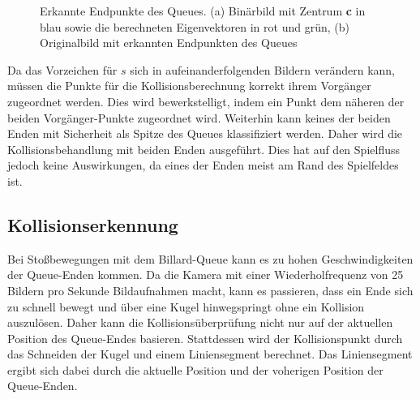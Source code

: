 \begin{figure}[H]
	\label{fig:pca}
	\centering
	\caption{Erkannte Endpunkte des Queues. (a) Binärbild mit Zentrum \textbf{c} in blau sowie die berechneten Eigenvektoren in rot und grün, (b) Originalbild mit erkannten Endpunkten des Queues}
\end{figure}


Da das Vorzeichen für $s$ sich in aufeinanderfolgenden Bildern verändern kann, müssen die Punkte für die Kollisionsberechnung korrekt ihrem Vorgänger zugeordnet werden.
Dies wird bewerkstelligt, indem ein Punkt dem näheren der beiden Vorgänger-Punkte zugeordnet wird.
Weiterhin kann keines der beiden Enden mit Sicherheit als Spitze des Queues klassifiziert werden.
Daher wird die Kollisionsbehandlung mit beiden Enden ausgeführt.
Dies hat auf den Spielfluss jedoch keine Auswirkungen, da eines der Enden meist am Rand des Spielfeldes ist.

\subsection{Kollisionserkennung}

Bei Stoßbewegungen mit dem Billard-Queue kann es zu hohen Geschwindigkeiten der Queue-Enden kommen. 
Da die Kamera mit einer Wiederholfrequenz von 25 Bildern pro Sekunde Bildaufnahmen macht, kann es passieren, dass ein Ende sich zu schnell bewegt und über eine Kugel hinwegspringt ohne ein Kollision auszulösen. 
Daher kann die Kollisionsüberprüfung nicht nur auf der aktuellen Position des Queue-Endes basieren.
Stattdessen wird der Kollisionspunkt durch das Schneiden der Kugel und einem  Liniensegment berechnet. 
Das Liniensegment ergibt sich dabei durch die aktuelle Position und der voherigen Position der Queue-Enden.

